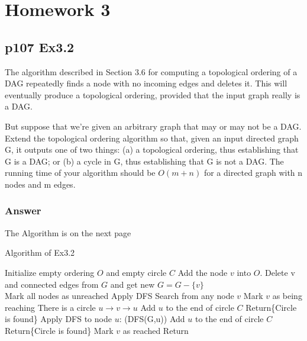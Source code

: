 \documentclass[a4paper]{article}
\begin{document}
\newpage
\section*{Homework 3}
\subsection*{p107 Ex3.2}
\begin{adjustwidth}{1cm}{1cm}
	The algorithm described in Section 3.6 for computing a topological ordering
	of a DAG repeatedly finds a node with no incoming edges and deletes
	it. This will eventually produce a topological ordering, provided that the
	input graph really is a DAG.
	\par But suppose that we’re given an arbitrary graph that may or may not
	be a DAG. Extend the topological ordering algorithm so that, given an
	input directed graph G, it outputs one of two things: (a) a topological
	ordering, thus establishing that G is a DAG; or (b) a cycle in G, thus
	establishing that G is not a DAG. The running time of your algorithm
	should be $O(m + n)$ for a directed graph with n nodes and m edges.
\end{adjustwidth}

\subsubsection*{Answer}
The Algorithm is on the next page
\begin{algorithm}[!htb]
	\caption{Algorithm of Ex3.2}
	\begin{algorithmic}[1]
		\State Initialize empty ordering $O$ and empty circle $C$
		\State Add the node $v$ into $O$.
		\State Delete v and connected edges from $G$ and get new $G = G-\{v\}$
		\EndWhile
		\\
		\Else
		\State Mark all nodes as unreached
		\State Apply DFS Search from any node $v$
		\State Mark $v$ as being reaching
		\State There is a circle $u \rightarrow v \rightarrow u$
		\State Add $u$ to the end of circle $C$
		\State Return\{Circle is found\}
		\EndIf
		\State Apply DFS to node $u$: (DFS(G,u))
		\State Add $u$ to the end of circle $C$
		\State Return\{Circle is found\}
		\EndIf
		\EndWhile
		\State Mark $v$ as reached
		\State Return
		\EndFunction
		\EndIf\\
	\end{algorithmic}
\end{algorithm}
\end{document}
